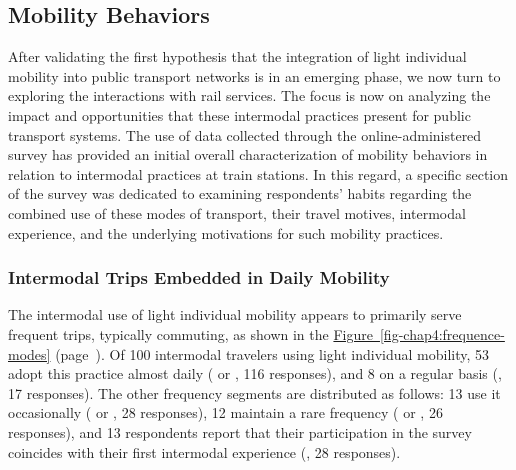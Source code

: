 \begin{refsegment}
\subsection{Mobility Behaviors
    \label{chap4:comportements-mobilite}
    }

After validating the first hypothesis that the integration of light individual mobility into public transport networks is in an emerging phase, we now turn to exploring the interactions with rail services. The focus is now on analyzing the impact and opportunities that these intermodal practices present for public transport systems. The use of data collected through the online-administered survey has provided an initial overall characterization of mobility behaviors in relation to intermodal practices at train stations. In this regard, a specific section of the survey was dedicated to examining respondents' habits regarding the combined use of these modes of transport, their travel motives, intermodal experience, and the underlying motivations for such mobility practices.%

\subsubsection*{Intermodal Trips Embedded in Daily Mobility
    \label{chap4:frequence-motif-experience}
    }

The intermodal use of light individual mobility appears to primarily serve frequent trips, typically commuting, as shown in the \hyperref[fig-chap4:frequence-modes]{Figure~\ref{fig-chap4:frequence-modes}} (page~\pageref{fig-chap4:frequence-modes}). Of 100 intermodal travelers using light individual mobility, 53 adopt this practice almost daily ( or , 116 responses), and 8 on a regular basis (, 17 responses). The other frequency segments are distributed as follows: 13 use it occasionally ( or , 28 responses), 12 maintain a rare frequency ( or , 26 responses), and 13 respondents report that their participation in the survey coincides with their first intermodal experience (, 28 responses).%


\end{refsegment}
